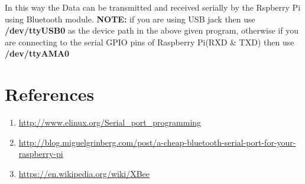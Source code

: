\documentclass[11pt,a4paper]{article}
\begin{document}
	In this way the Data can be transmitted and received serially by the Rspberry Pi using Bluetooth module.
	\newline 
	\textbf{NOTE:} if you are using USB jack then use \textbf{/dev/ttyUSB0} as the device path in the above given program, otherwise if you are connecting to the serial GPIO pins of Raspberry Pi(RXD \& TXD) then use \textbf{/dev/ttyAMA0}
	\section{References}
		\begin{enumerate}
			\item \url{http://www.elinux.org/Serial_port_programming}
			\item \url{http://blog.miguelgrinberg.com/post/a-cheap-bluetooth-serial-port-for-your-raspberry-pi}
			\item \url{https://en.wikipedia.org/wiki/XBee}
		\end{enumerate}
\end{document}
